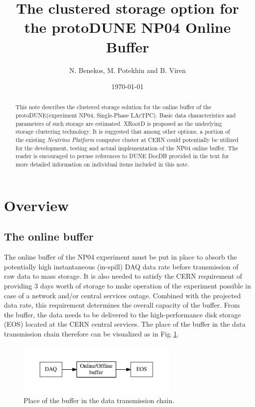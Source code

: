 \documentclass[pdftex,12pt,letter]{article}
\title{The clustered storage option for the protoDUNE NP04 Online Buffer}
\date{\today}
\author{N. Benekos, M. Potekhin and B. Viren}
\newcommand{\pd}{protoDUNE\xspace}
\newcommand{\xrd}{XRootD\xspace}
\begin{document}
\maketitle

\begin{abstract}
\noindent  This note describes the clustered storage
solution for the online buffer of the \pd (experiment NP04, Single-Phase LArTPC).
Basic data characteristics and  parameters of such storage are estimated. \xrd is proposed as the underlying
storage clustering technology. It is suggested that among other options, a portion of the existing   \textit{Neutrino Platform}
computer cluster at CERN could potentially be utilized for the development, testing and actual implementation of the NP04 online buffer. 
The reader is encouraged to peruse references to DUNE DocDB provided in the text for more detailed information on individual
items included in this note.
\end{abstract}

\section{Overview}
\subsection{The online buffer}
The online buffer of the NP04 experiment must be put in place to absorb the potentially high instantaneous (in-spill) DAQ
data rate before transmission of raw data to mass storage. It is also needed to satisfy the CERN requirement of providing
3 days worth of storage to make operation of the experiment possible in case of a network and/or central services outage.
Combined with the projected data rate, this requirement determines the overall capacity of the buffer. From the buffer,
the data needs to be delivered to the high-performance  disk storage (EOS) located at the CERN central services.
The place of the buffer in the data transmission chain therefore can be visualized as in Fig.\,\ref{fig:big-picture}.
\begin{figure}[tbh]
  \centering
  \includegraphics[width=0.7\textwidth]{figures/big-picture.pdf}
  \caption{Place of the buffer in the data transmission chain.}
  \label{fig:big-picture}
\end{figure}
\end{document}
